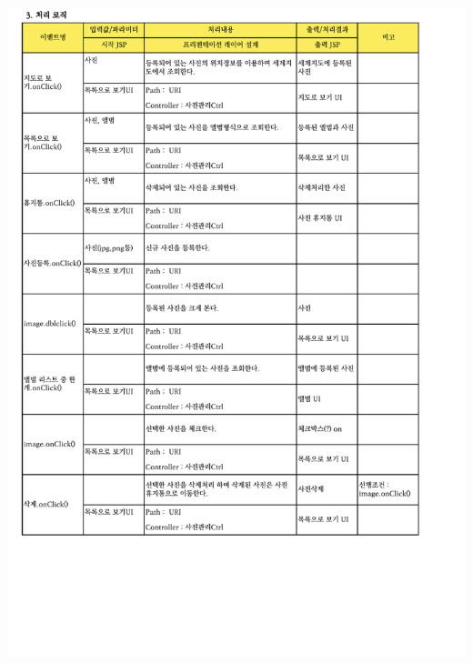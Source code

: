 {{{{{{{{{{{{{{{{{{{{{{{{{{{{{{{{{{{{{\includegraphics[width=20cm]{./Figure/Analysis/Display/photo/photo_04.pdf} \\
}}}}}}}}}}}}}}}}}}}}}}}}}}}}}}}}}}}}}
